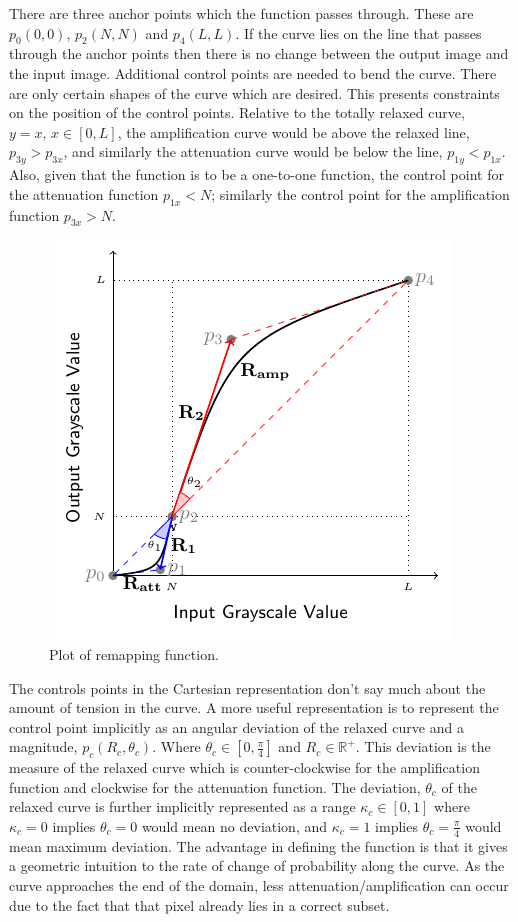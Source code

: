 \documentclass[a4paper,11pt]{ijamas}
\begin{document}
There are three anchor points which the function passes through. These are $p_0(0,0)$, $p_2(N, N)$ and $p_4(L,L)$. If the curve lies on the line that passes through the anchor points then there is no change between the output image and the input image. Additional control points are needed to bend the curve.
There are only certain shapes of the curve which are desired. This presents constraints on the position of the control points. Relative to the totally relaxed curve, $y=x, \, x \in [0,L]$, the amplification curve would be above the relaxed line, $p_{3y} > p_{3x}$, and similarly the attenuation curve would be below the line, $p_{1y} < p_{1x}$. Also, given that the function is to be a one-to-one function, the control point for the attenuation function $p_{1x}<N$; similarly the control point for the amplification function $p_{3x}>N$.


\begin{figure}[!h]
\centering
\includegraphics[width=0.80\columnwidth]{figs/remapfcn.pdf}
\caption{Plot of remapping function.}
\label{fig:mapping_plot}
\end{figure}

The controls points in the Cartesian representation don't say much about the amount of tension in the curve. A more useful representation is to represent the control point implicitly as an angular deviation of the relaxed curve and a magnitude, $p_c(R_c, \theta_c)$. Where $\theta_c \in [0, \frac{\pi}{4}]$ and $R_c \in \mathbb{R}^+$. This deviation is the measure of the relaxed curve which is counter-clockwise for the amplification function and clockwise for the attenuation function. The deviation, $\theta_c$ of the relaxed curve is further implicitly represented as a range $\kappa_c \in [0,1]$ where $\kappa_c=0$ implies $\theta_c = 0$ would mean no deviation, and $\kappa_c = 1$ implies $\theta_c = \frac{\pi}{4}$ would mean maximum deviation.
The advantage in defining the function is that it gives a geometric intuition to the rate of change of probability along the curve. As the curve approaches the end of the domain, less attenuation/amplification can occur due to the fact that that pixel already lies in a correct subset.
\end{document}
